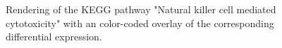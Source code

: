 \documentclass[11pt,a4paper]{article}
\begin{document}
\begin{figure}

    \caption{Rendering of the KEGG pathway "Natural killer cell mediated cytotoxicity" with an color-coded overlay of
    the corresponding differential expression.}
\end{figure}
\end{document}
